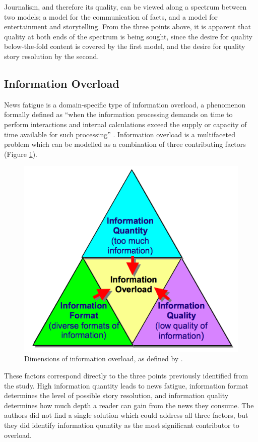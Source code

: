  Journalism, and therefore its quality, can be viewed along a spectrum between two models; a model for the communication of facts, and a model for entertainment and storytelling. From the three points above, it is apparent that quality at both ends of the spectrum is being sought, since the desire for quality below-the-fold content is covered by the first model, and the desire for quality story resolution by the second.

\subsection{Information Overload \label{sec:information-overload}}

News fatigue is a domain-specific type of information overload, a phenomenon formally defined as ``when the information processing demands on time to perform interactions and internal calculations exceed the supply or capacity of time available for such processing'' \citep[p.206]{InformationOverloadATemporalApproach}. Information overload is a multifaceted problem which can be modelled as a combination of three contributing factors (Figure \ref{fig:dimensions}).

\begin{figure}[htbp!]
	\centering
	\includegraphics[width=.5\textwidth]{img/lit-survey/overload-model.png}
	\caption{Dimensions of information overload, as defined by \citet{TowardsAnOptimalResolutionToInformationOverload}.}
	\label{fig:dimensions}
\end{figure}

These factors correspond directly to the three points previously identified from the \citeauthor{anewmodelfornews} study. High information quantity leads to news fatigue, information format determines the level of possible story resolution, and information quality determines how much depth a reader can gain from the news they consume. The authors did not find a single solution which could address all three factors, but they did identify information quantity as the most significant contributor to overload.

